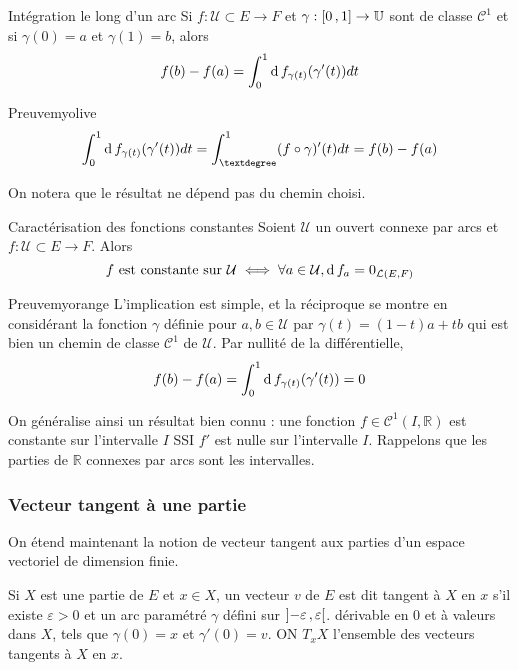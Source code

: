     \begin{prop}{Intégration le long d’un arc}{}
        Si $f : \mathcal{U} \subset E \to F$ et $\gamma : \left[ 0 \, , 1 \right] \to \mathbb{U}$ sont de classe $\mathcal{C}^1$ et si $\gamma(0) = a$ et $\gamma(1) = b$, alors 
        \[ f(b) - f(a) = \int_{0}^{1} \operatorname{d} f_{\gamma(t)}(\gamma'(t))dt \]   
    \end{prop}

    \begin{demo}{Preuve}{myolive}
        \[ \int_{0}^{1} \d f_{\gamma(t)} (\gamma'(t))dt = \int_{°}^{1} (f \circ \gamma)'(t)dt = f(b) - f(a) \]   
    \end{demo}

    On notera que le résultat ne dépend pas du chemin choisi.

    \begin{coro}{Caractérisation des fonctions constantes}{}
        Soient $\mathcal{U}$ un ouvert connexe par arcs et $f : \mathcal{U} \subset E \to F$. Alors 
        \[ f \text{ est constante sur } \mathcal{U} \iff \forall a \in \mathcal{U}, \operatorname{d} f_a = 0_{\mathcal{L}(E,F)} \]   
    \end{coro}

    \begin{demo}{Preuve}{myorange}
        L’implication est simple, et la réciproque se montre en considérant la fonction $\gamma$ définie pour $a,b \in \mathcal{U}$ par $\gamma(t) = (1-t)a + tb$ qui est bien un chemin de classe $\mathcal{C}^1$ de $\mathcal{U}$. Par nullité de la différentielle, 
        \[ f(b) - f(a) = \int_{0}^{1} \operatorname{d} f_{\gamma(t)}(\gamma'(t)) = 0 \]   
    \end{demo}

    On généralise ainsi un résultat bien connu : une fonction $f \in \mathcal{C}^1(I,\mathbb{R})$ est constante sur l’intervalle $I$ SSI $f'$ est nulle sur l’intervalle $I$. Rappelons que les parties de $\mathbb{R}$ connexes par arcs sont les intervalles. 

    \subsubsection{Vecteur tangent à une partie}

    On étend maintenant la notion de vecteur tangent aux parties d’un espace vectoriel de dimension finie. 

    \begin{defi}{}{}
        Si $X$ est une partie de $E$ et $x \in X$, un vecteur $v$ de $E$ est dit tangent à $X$ en $x$ s’il existe $\varepsilon > 0$ et un arc paramétré $\gamma$ défini sur $\left] -\varepsilon \, , \varepsilon \right[$. dérivable en $0$ et à valeurs dans $X$, tels que $\gamma(0) = x$ et $\gamma'(0) = v$. ON $T_x X$ l’ensemble des vecteurs tangents à $X$ en $x$.
    \end{defi}

